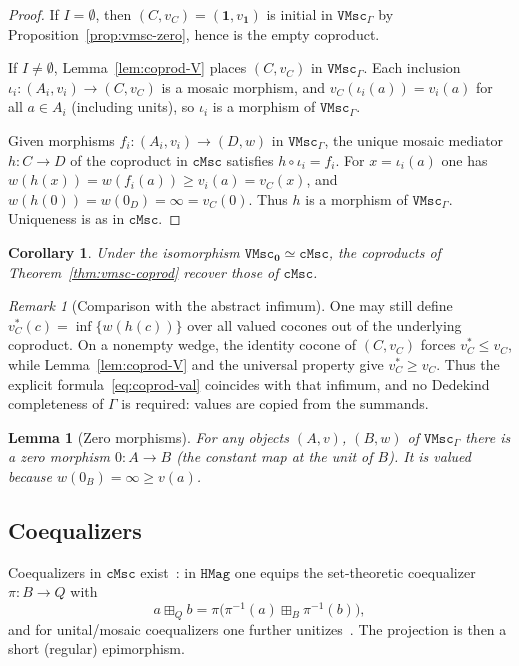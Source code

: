 \documentclass[11pt]{amsart}
\theoremstyle{plain}
\newtheorem{lemma}[theorem]{Lemma}
\newtheorem{corollary}[theorem]{Corollary}
\theoremstyle{definition}
\theoremstyle{remark}
\newtheorem{remark}[theorem]{Remark}
\newcommand{\cMsc}{\mathtt{cMsc}}
\newcommand{\VMsc}{\mathtt{VMsc}}
\newcommand{\VMscG}{\mathtt{VMsc}_{\Gamma}}
\begin{document}
\begin{proof}
If \(I=\emptyset\), then \((C,v_C)=(\mathbf{1},v_{\mathbf{1}})\) is initial in \(\VMscG\) by Proposition~\ref{prop:vmsc-zero}, hence is the empty coproduct.

If \(I\neq\emptyset\), Lemma~\ref{lem:coprod-V} places \((C,v_C)\) in \(\VMscG\). Each inclusion \(\iota_i\colon(A_i,v_i)\to(C,v_C)\) is a mosaic morphism, and \(v_C(\iota_i(a))=v_i(a)\) for all \(a\in A_i\) (including units), so \(\iota_i\) is a morphism of \(\VMscG\).

Given morphisms \(f_i\colon(A_i,v_i)\to(D,w)\) in \(\VMscG\), the unique mosaic mediator \(h\colon C\to D\) of the coproduct in \(\cMsc\) satisfies \(h\circ\iota_i=f_i\). For \(x=\iota_i(a)\) one has \(w(h(x))=w(f_i(a))\ge v_i(a)=v_C(x)\), and \(w(h(0))=w(0_D)=\infty=v_C(0)\). Thus \(h\) is a morphism of \(\VMscG\). Uniqueness is as in \(\cMsc\).
\end{proof}

\begin{corollary}
\label{cor:coprod-triv}
Under the isomorphism \(\VMsc_{\mathbf{0}}\simeq\cMsc\), the coproducts of Theorem~\ref{thm:vmsc-coprod} recover those of \(\cMsc\).
\end{corollary}

\begin{remark}[Comparison with the abstract infimum]
\label{rem:inf-vs-explicit}
One may still define \(v_C^\ast(c)=\inf\{w(h(c))\}\) over all valued cocones out of the underlying coproduct. On a nonempty wedge, the identity cocone of \((C,v_C)\) forces \(v_C^\ast\le v_C\), while Lemma~\ref{lem:coprod-V} and the universal property give \(v_C^\ast\ge v_C\). Thus the explicit formula~\eqref{eq:coprod-val} coincides with that infimum, and no Dedekind completeness of \(\Gamma\) is required: values are copied from the summands.
\end{remark}

\begin{lemma}[Zero morphisms]
\label{lem:zero-morph}
For any objects \((A,v)\), \((B,w)\) of \(\VMscG\) there is a zero morphism \(0\colon A\to B\) (the constant map at the unit of \(B\)). It is valued because \(w(0_B)=\infty\ge v(a)\).
\end{lemma}

\subsection{Coequalizers}

Coequalizers in \(\cMsc\) exist~\cite{NR23}: in \(\mathtt{HMag}\) one equips the set-theoretic coequalizer \(\pi\colon B\to Q\) with
\begin{equation}
\label{eq:short-coeq}
a\boxplus_Q b=\pi\bigl(\pi^{-1}(a)\boxplus_B\pi^{-1}(b)\bigr),
\end{equation}
and for unital/mosaic coequalizers one further unitizes~\cite[Theorem~3.11, Theorem~4.1]{NR23}. The projection is then a short (regular) epimorphism.
\end{document}
